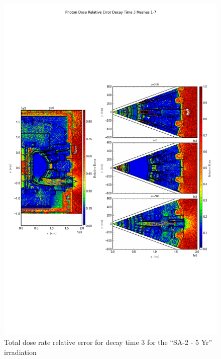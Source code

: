\documentclass[12pt]{article}
\begin{document}
\begin{figure}[ht!]
\centering
\includegraphics[trim={0cm 8cm, 0cm 8cm},clip,scale=0.75]{../plots/final_model_with_b4c/10year/Photon_Dose_Relative_Error_Decay_Time_3_Meshes_1-7.png}
\caption{Total dose rate relative error for decay time 3 for the ``SA-2 - 5 Yr'' irradiation}
\label{fig:photons_10y_dc3_b4c_relerr}
\end{figure}
\newpage
\end{document}
